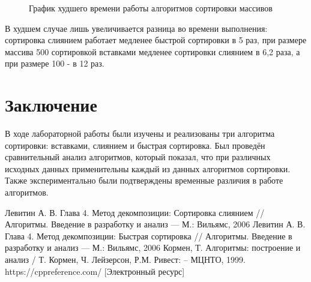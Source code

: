 \documentclass[12pt, a4paper]{report}
\begin{document}
	\begin{figure}[ht!]
		\caption{График худшего времени работы алгоритмов сортировки массивов}
		\label{graph3-time}
	\end{figure}

	В худшем случае лишь увеличивается разница во времени выполнения: сортировка слиянием работает медленее быстрой сортировки в 5 раз, при размере массива 500 сортировкой вставками медленее сортировки слиянием в 6,2 раза, а при размере 100 - в 12 раз.

	\chapter*{Заключение}
	
	В ходе лабораторной работы были изучены и реализованы три алгоритма сортировки: вставками, слиянием и быстрая сортировка. Был проведён сравнительный анализ алгоритмов, который показал, что при различных исходных данных применительны каждый из данных алгоритмов сортировки. Также экспериментально были подтверждены временные различия в работе алгоритмов.
	
	\newpage
	
	\begin{thebibliography}{}
	 Левитин А. В. Глава 4. Метод декомпозиции: Сортировка слиянием // Алгоритмы. Введение в разработку и анализ — М.: Вильямс, 2006
	 Левитин А. В. Глава 4. Метод декомпозиции: Быстрая сортировка // Алгоритмы. Введение в разработку и анализ — М.: Вильямс, 2006
	 Кормен, Т. Алгоритмы: построение и анализ / Т. Кормен, Ч. Лейзерсон, Р.М. Ривест: – МЦНТО, 1999.
	 https://cppreference.com/ [Электронный ресурс]
	\end{thebibliography}
\end{document}
